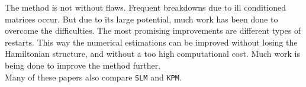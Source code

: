 \noindent The method is not without flaws. Frequent breakdowns due to ill conditioned matrices occur. But due to its large potential, much work has been done to overcome the difficulties. The most promising improvements are different types of restarts. This way the numerical estimations can be improved without losing the Hamiltonian structure, and without a too high computational cost. Much work is being done to improve the method further. \\

\noindent Many of these papers also compare \texttt{SLM} and \texttt{KPM}.


 
